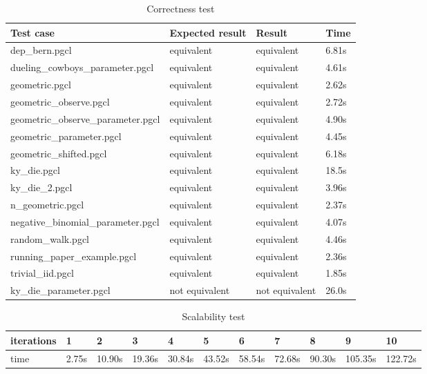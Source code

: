 \documentclass[a4paper]{article}
\begin{document}
\begin{table}[htbp]
	\centering
	\begin{tabular}{llll}
		\hline
		Test case                        & Expected result & Result         & Time  \\
		\hline
		dep_bern.pgcl                    & equivalent      & equivalent     & 6.81s \\
		dueling_cowboys_parameter.pgcl   & equivalent      & equivalent     & 4.61s \\
		geometric.pgcl                   & equivalent      & equivalent     & 2.62s \\
		geometric_observe.pgcl           & equivalent      & equivalent     & 2.72s \\
		geometric_observe_parameter.pgcl & equivalent      & equivalent     & 4.90s \\
		geometric_parameter.pgcl         & equivalent      & equivalent     & 4.45s \\
		geometric_shifted.pgcl           & equivalent      & equivalent     & 6.18s \\
		ky_die.pgcl                      & equivalent      & equivalent     & 18.5s \\
		ky_die_2.pgcl                    & equivalent      & equivalent     & 3.96s \\
		n_geometric.pgcl                 & equivalent      & equivalent     & 2.37s \\
		negative_binomial_parameter.pgcl & equivalent      & equivalent     & 4.07s \\
		random_walk.pgcl                 & equivalent      & equivalent     & 4.46s \\
		running_paper_example.pgcl       & equivalent      & equivalent     & 2.36s \\
		trivial_iid.pgcl                 & equivalent      & equivalent     & 1.85s \\
		ky_die_parameter.pgcl            & not equivalent  & not equivalent & 26.0s \\
		\hline
	\end{tabular}
	\caption{Correctness test}\label{tab:test1}
\end{table}

\begin{table}[htbp]
	\centering
	\begin{tabular}{l|llllllllll}
		\hline
		iterations & 1     & 2      & 3      & 4      & 5      & 6      & 7      & 8      & 9       & 10      \\
		\hline
		time       & 2.75s & 10.90s & 19.36s & 30.84s & 43.52s & 58.54s & 72.68s & 90.30s & 105.35s & 122.72s \\
		\hline
	\end{tabular}
	\caption{Scalability test}\label{tab:test2}
\end{table}
\end{document}
